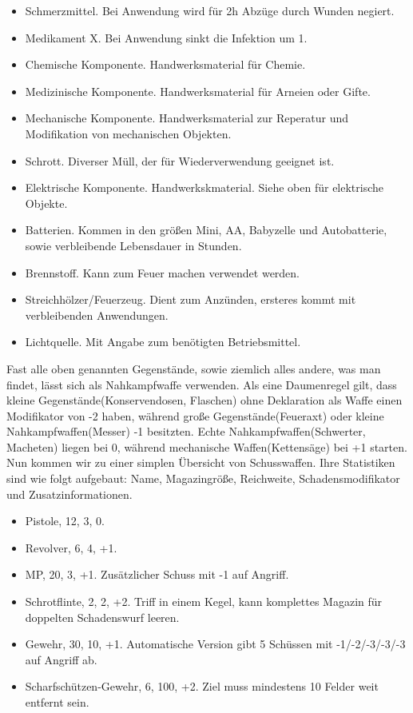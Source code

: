 \documentclass[twoside,a4paper]{minimal}
\begin{document}
\begin{multicols*}{3}
\begin{itemize}
\item Schmerzmittel. Bei Anwendung wird für 2h Abzüge durch Wunden negiert.
\item Medikament X. Bei Anwendung sinkt die Infektion um 1.
\item Chemische Komponente. Handwerksmaterial für Chemie.
\item Medizinische Komponente. Handwerksmaterial für Arneien oder Gifte.
\item Mechanische Komponente. Handwerksmaterial zur Reperatur und Modifikation von mechanischen Objekten.
\item Schrott. Diverser Müll, der für Wiederverwendung geeignet ist.
\item Elektrische Komponente. Handwerkskmaterial. Siehe oben für elektrische Objekte.
\item Batterien. Kommen in den größen Mini, AA, Babyzelle und Autobatterie, sowie verbleibende Lebensdauer in Stunden.
\item Brennstoff. Kann zum Feuer machen verwendet werden.
\item Streichhölzer/Feuerzeug. Dient zum Anzünden, ersteres kommt mit verbleibenden Anwendungen.
\item Lichtquelle. Mit Angabe zum benötigten Betriebsmittel.
\end{itemize}
Fast alle oben genannten Gegenstände, sowie ziemlich alles andere, was man findet, lässt sich als Nahkampfwaffe verwenden. Als eine Daumenregel gilt, dass kleine Gegenstände(Konservendosen, Flaschen) ohne Deklaration als Waffe einen Modifikator von -2 haben, während große Gegenstände(Feueraxt) oder kleine Nahkampfwaffen(Messer) -1 besitzten. Echte Nahkampfwaffen(Schwerter, Macheten) liegen bei 0, während mechanische Waffen(Kettensäge) bei +1 starten.
Nun kommen wir zu einer simplen Übersicht von Schusswaffen. Ihre Statistiken sind wie folgt aufgebaut: Name, Magazingröße, Reichweite, Schadensmodifikator und Zusatzinformationen.
\begin{itemize}
\item Pistole, 12, 3, 0.
\item Revolver, 6, 4, +1.
\item MP, 20, 3, +1. Zusätzlicher Schuss mit -1 auf Angriff. 
\item Schrotflinte, 2, 2, +2. Triff in einem Kegel, kann komplettes Magazin für doppelten Schadenswurf leeren.
\item Gewehr, 30, 10, +1. Automatische Version gibt 5 Schüssen mit -1/-2/-3/-3/-3 auf Angriff ab.
\item Scharfschützen-Gewehr, 6, 100, +2. Ziel muss mindestens 10 Felder weit entfernt sein. 

\end{itemize}
\end{multicols*}
\end{document}
